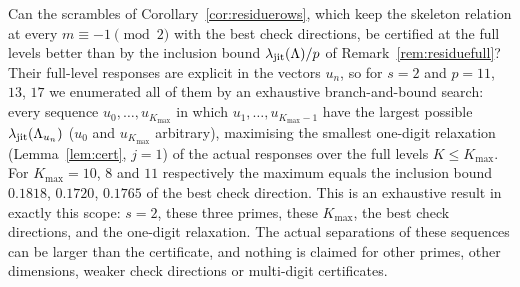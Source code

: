 \begin{remark}\label{rem:skelsearch}
Can the scrambles of Corollary~\ref{cor:residuerows}, which keep the skeleton relation at every $m\equiv-1\pmod2$ with the best check directions, be certified at the full levels better than by the inclusion bound $\lambda_{\mathrm{jit}}(\Lambda)/p$ of Remark~\ref{rem:residuefull}? Their full-level responses are explicit in the vectors $u_n$, so for $s=2$ and $p=11$, $13$, $17$ we enumerated all of them by an exhaustive branch-and-bound search: every sequence $u_0,\dots,u_{K_{\max}}$ in which $u_1,\dots,u_{K_{\max}-1}$ have the largest possible $\lambda_{\mathrm{jit}}(\Lambda_{u_n})$ ($u_0$ and $u_{K_{\max}}$ arbitrary), maximising the smallest one-digit relaxation (Lemma~\ref{lem:cert}, $j=1$) of the actual responses over the full levels $K\le K_{\max}$. For $K_{\max}=10$, $8$ and $11$ respectively the maximum equals the inclusion bound $0.1818$, $0.1720$, $0.1765$ of the best check direction. This is an exhaustive result in exactly this scope: $s=2$, these three primes, these $K_{\max}$, the best check directions, and the one-digit relaxation. The actual separations of these sequences can be larger than the certificate, and nothing is claimed for other primes, other dimensions, weaker check directions or multi-digit certificates.
\end{remark}

